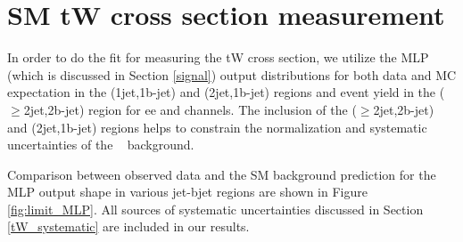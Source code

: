 \clearpage
\section{SM tW cross section measurement}
\label{App_tW_XS}

In order to do the fit for measuring the tW cross section, we utilize the MLP (which is discussed in Section \ref{signal}) output distributions for both data and MC expectation in the (1jet,1b-jet) and (2jet,1b-jet) regions and event yield in the ($\geq$2jet,2b-jet) region for ee and \mumu channels. The inclusion of the ($\geq$2jet,2b-jet) and (2jet,1b-jet) regions helps to constrain the normalization and systematic uncertainties of the \ttbar~ background.

Comparison between observed data and the SM background prediction for the MLP output shape in various jet-bjet regions are shown in Figure \ref{fig:limit_MLP}.
All sources of systematic uncertainties discussed in Section \ref{tW_systematic} are included in our results.

